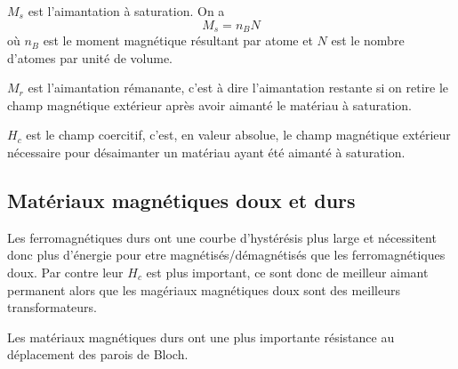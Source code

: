 \documentclass[11pt,a4paper]{article}
\begin{document}
$M_s$ est l'aimantation à saturation.
On a
\[ M_s = n_B N \]
où $n_B$ est le moment magnétique résultant par atome et $N$ est le nombre d'atomes par unité de volume.

$M_r$ est l'aimantation rémanante, c'est à dire l'aimantation restante si on retire le champ magnétique extérieur après avoir aimanté le matériau à saturation.

$H_c$ est le champ coercitif, c'est, en valeur absolue, le champ magnétique extérieur nécessaire pour désaimanter un matériau ayant été aimanté à saturation.

\subsection{Matériaux magnétiques doux et durs}
Les ferromagnétiques durs ont une courbe d'hystérésis plus large et nécessitent donc plus d'énergie pour etre magnétisés/démagnétisés que les ferromagnétiques doux.
Par contre leur $H_c$ est plus important, ce sont donc de meilleur aimant permanent alors que les magériaux magnétiques doux sont des meilleurs transformateurs.

Les matériaux magnétiques durs ont une plus importante résistance au déplacement des parois de Bloch.
\end{document}
